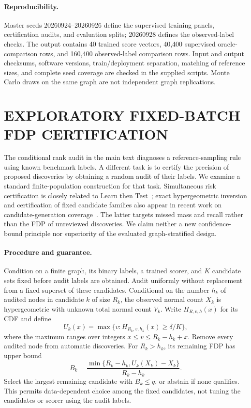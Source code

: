 \paragraph{Reproducibility.}
Master seeds 20260924--20260926 define the supervised training panels, certification audits, and evaluation splits; 20260928 defines the observed-label checks. The output contains 40 trained score vectors, 40,400 supervised oracle-comparison rows, and 160,400 observed-label comparison rows. Input and output checksums, software versions, train/deployment separation, matching of reference sizes, and complete seed coverage are checked in the supplied scripts. Monte Carlo draws on the same graph are not independent graph replications.

\clearpage
\section{EXPLORATORY FIXED-BATCH FDP CERTIFICATION}
\label{app:certificate}
The conditional rank audit in the main text diagnoses a reference-sampling rule using known benchmark labels. A different task is to certify the precision of proposed discoveries by obtaining a random audit of their labels. We examine a standard finite-population construction for that task. Simultaneous risk certification is closely related to Learn then Test~\citep{angelopoulos2022ltt}; exact hypergeometric inversion and certification of fixed candidate families also appear in recent work on candidate-generation coverage~\citep{anthony2026audits}. The latter targets missed mass and recall rather than the FDP of unreviewed discoveries. We claim neither a new confidence-bound principle nor superiority of the evaluated graph-stratified design.

\paragraph{Procedure and guarantee.}
Condition on a finite graph, its binary labels, a trained scorer, and $K$ candidate sets fixed before audit labels are obtained. Audit uniformly without replacement from a fixed superset of these candidates. Conditional on the number $h_k$ of audited nodes in candidate $k$ of size $R_k$, the observed normal count $X_k$ is hypergeometric with unknown total normal count $V_k$. Write $H_{R,v,h}(x)$ for its CDF and define
\[
 U_k(x)=\max\{v:H_{R_k,v,h_k}(x)\ge\delta/K\},
\]
where the maximum ranges over integers $x\le v\le R_k-h_k+x$. Remove every audited node from automatic discoveries. For $R_k>h_k$, its remaining FDP has upper bound
\[
 B_k=\frac{\min\{R_k-h_k,U_k(X_k)-X_k\}}{R_k-h_k}.
\]
Select the largest remaining candidate with $B_k\le q$, or abstain if none qualifies. This permits data-dependent choice among the fixed candidates, not tuning the candidates or scorer using the audit labels.


